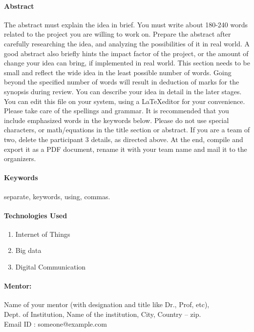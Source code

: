 \documentclass[12pt, a4paper, twoside]{article}
\begin{document}
	\paragraph{Abstract} The abstract must explain the idea in brief. You must write about 180-240 words related to the project you are willing to work on. Prepare the abstract after carefully researching the idea, and analyzing the possibilities of it in real world. A good abstract also briefly hints the impact factor of the project, or the amount of change your idea can bring, if implemented in real world. This section needs to be small and reflect the wide idea in the least possible number of words. Going beyond the specified number of words will result in deduction of marks for the synopsis during review. You can describe your idea in detail in the later stages. You can edit this file on your system, using a \LaTeX editor for your convenience. Please take care of the spellings and grammar. It is recommended that you include emphasized words in the keywords below. Please do not use special characters, or math/equations in the title section or abstract. If you are a team of two, delete the participant 3 details, as directed above. At the end, compile and export it as a PDF document, rename it with your team name and mail it to the organizers.
	\paragraph{Keywords} separate, keywords, using, commas.
	\paragraph{Technologies Used}
	\begin{enumerate}
		\item Internet of Things
		\item Big data
		\item Digital Communication
	\end{enumerate}
	\paragraph{Mentor: }%
	Name of your mentor (with designation and title like Dr., Prof, etc),\\
	Dept. of Institution, Name of the institution, City, Country – zip.\\
	Email ID : someone@example.com
\end{document}
